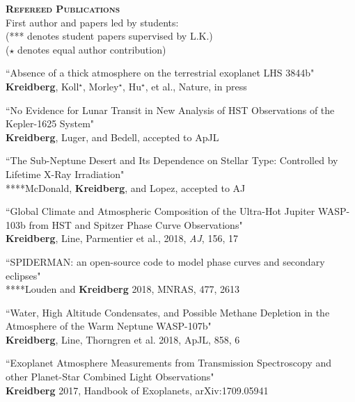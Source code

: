 \documentclass[12pt,letterpaper]{article}
\begin{document}
\textbf{\textsc{Refereed Publications}} \\
\vspace{1mm}
\hspace*{5mm}First author and papers led by students: \\
\hspace*{5mm}(*** denotes student papers supervised by L.K.)\\
\hspace*{5mm}($\star$ denotes equal author contribution)
\begin{compactenum}
\item ``Absence of a thick atmosphere on the terrestrial exoplanet LHS 3844b"\\ 
\textbf{Kreidberg}, Koll$^\star$, Morley$^\star$, Hu$^\star$, et al., Nature, in press
                                                                                
\item ``No Evidence for Lunar Transit in New Analysis of HST Observations of the Kepler-1625 System"\\
\textbf{Kreidberg}, Luger, and Bedell, accepted to ApJL

\item``The Sub-Neptune Desert and Its Dependence on Stellar Type: Controlled by Lifetime X-Ray Irradiation"\\
****McDonald, \textbf{Kreidberg}, and Lopez, accepted to AJ 

\item ``Global Climate and Atmospheric Composition of the Ultra-Hot Jupiter WASP-103b from HST and Spitzer Phase Curve Observations"\\
\textbf{Kreidberg}, Line, Parmentier et al., 2018, \textit{AJ}, 156, 17

\item ``SPIDERMAN: an open-source code to model phase curves and secondary eclipses"\\
****Louden and \textbf{Kreidberg} 2018, MNRAS, 477, 2613 

\item ``Water, High Altitude Condensates, and Possible Methane Depletion in the Atmosphere of the Warm Neptune WASP-107b"\\
\textbf{Kreidberg}, Line, Thorngren et al. 2018, ApJL, 858, 6 

\item ``Exoplanet Atmosphere Measurements from Transmission Spectroscopy and other Planet-Star Combined Light Observations"\\
\textbf{Kreidberg} 2017, Handbook of Exoplanets,  arXiv:1709.05941


\end{compactenum}
\end{document}
